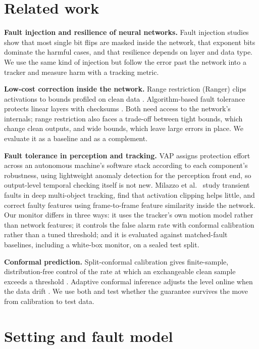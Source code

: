 \documentclass[11pt]{article}
\begin{document}
\section{Related work}

\textbf{Fault injection and resilience of neural networks.} Fault injection studies \citep{li2017understanding,reagen2018ares,mahmoud2020pytorchfi} show that most single bit flips are masked inside the network, that exponent bits dominate the harmful cases, and that resilience depends on layer and data type. We use the same kind of injection but follow the error past the network into a tracker and measure harm with a tracking metric.

\textbf{Low-cost correction inside the network.} Range restriction (Ranger) clips activations to bounds profiled on clean data \citep{chen2021ranger}. Algorithm-based fault tolerance protects linear layers with checksums \citep{huang1984abft}. Both need access to the network's internals; range restriction also faces a trade-off between tight bounds, which change clean outputs, and wide bounds, which leave large errors in place. We evaluate it as a baseline and as a complement.

\textbf{Fault tolerance in perception and tracking.} VAP \citep{wan2024vap} assigns protection effort across an autonomous machine's software stack according to each component's robustness, using lightweight anomaly detection for the perception front end, so output-level temporal checking itself is not new. Milazzo et al.\ \citep{milazzo2025fault} study transient faults in deep multi-object tracking, find that activation clipping helps little, and correct faulty features using frame-to-frame feature similarity inside the network. Our monitor differs in three ways: it uses the tracker's own motion model rather than network features; it controls the false alarm rate with conformal calibration rather than a tuned threshold; and it is evaluated against matched-fault baselines, including a white-box monitor, on a sealed test split.

\textbf{Conformal prediction.} Split-conformal calibration gives finite-sample, distribution-free control of the rate at which an exchangeable clean sample exceeds a threshold \citep{vovk2005algorithmic,angelopoulos2021gentle}. Adaptive conformal inference adjusts the level online when the data drift \citep{gibbs2021aci}. We use both and test whether the guarantee survives the move from calibration to test data.

\section{Setting and fault model}
\end{document}
